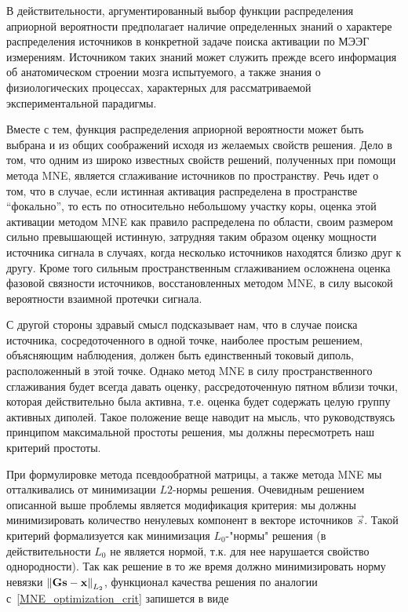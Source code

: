 В действительности, аргументированный выбор функции распределения априорной
вероятности предполагает наличие определенных знаний о характере распределения
источников в конкретной задаче поиска активации по МЭЭГ измерениям. Источником
таких знаний может служить прежде всего информация об анатомическом строении
мозга испытуемого, а также знания о физиологических процессах, характерных для
рассматриваемой экспериментальной парадигмы.

Вместе с тем, функция распределения априорной вероятности может быть выбрана и из
общих соображений исходя из желаемых свойств решения. Дело в том, что одним из
широко известных свойств решений, полученных при помощи метода MNE, является
сглаживание источников по пространству. Речь идет о том, что в случае,
если истинная активация распределена в пространстве ``фокально'', то есть
по относительно небольшому участку коры, оценка этой активации методом
MNE как правило распределена по области, своим размером сильно превышающей
истинную, затрудняя таким образом оценку мощности источника сигнала в
случаях, когда несколько источников находятся близко друг к другу.
Кроме того сильным пространственным сглаживанием осложнена оценка фазовой
связности источников, восстановленных методом MNE, в силу высокой вероятности
взаимной протечки сигнала.

С другой стороны здравый смысл подсказывает нам, что в случае поиска источника,
сосредоточенного в одной точке, наиболее простым решением, объясняющим
наблюдения, должен быть единственный токовый диполь, расположенный в этой
точке. Однако метод MNE в силу пространственного сглаживания будет всегда
давать оценку, рассредоточенную пятном вблизи точки, которая действительно была
активна, т.е. оценка будет содержать целую группу активных диполей.
Такое положение веще наводит на мысль, что руководствуясь принципом
максимальной простоты решения, мы должны пересмотреть наш критерий простоты.

При формулировке метода псевдообратной матрицы, а также метода MNE мы
отталкивались от минимизации $L2$-нормы решения. Очевидным решением описанной
выше проблемы является модификация критерия: мы должны минимизировать
количество ненулевых компонент в векторе источников $\vec{s}$. Такой
критерий формализуется как минимизация $L_0$-"нормы" решения (в действительности $L_0$ не является нормой,
т.к. для нее нарушается свойство однородности). Так как решение в то же время
должно минимизировать норму невязки $\left\lVert\mathbf{Gs - x}\right\rVert_{L_2}$, функционал
качества решения по аналогии с~\ref{MNE_optimization_crit} запишется в виде

